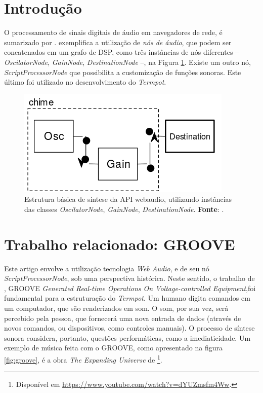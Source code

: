 \section{Introdução}\label{sec:introducao}




O processamento de sinais digitais de áudio em navegadores de rede, é sumarizado por \cite{w3c_web_2012,roberts_web_2013-,wyse_viability_2014}. \cite{srikumar_tamming_2013} exemplifica a utilização de \emph{nós de áudio}, que podem ser concatenados em um grafo de DSP, como três instâncias de nós diferentes -- \emph{OscilatorNode}, \emph{GainNode}, \emph{DestinationNode} --, na Figura \ref{fig:shime}. Existe um outro nó, \emph{ScriptProcessorNode} que possibilita a customização de funções sonoras. Este último foi utilizado no desenvolvimento do \emph{Termpot}.

\begin{figure}[h]
\centering
\includegraphics[scale=0.35]{chime.png}
\caption{Estrutura básica de síntese da API webaudio, utilizando instâncias das classes \emph{OscilatorNode}, \emph{GainNode}, \emph{DestinationNode}. \textbf{Fonte}: \cite{srikumar_tamming_2013}.}
\label{fig:shime}
\end{figure}

\section{Trabalho relacionado: GROOVE}

Este artigo envolve a utilização  tecnologia \emph{Web Audio}, e de seu nó \emph{ScriptProcessorNode}, sob uma perspectiva histórica. Neste sentido, o trabalho de \cite{mathews_groove_1970}, GROOVE \emph{Generated Real-time Operations On Voltage-controlled Equipment},foi fundamental para a estruturação do \emph{Termpot}. Um humano digita comandos em um computador, que são renderizados em som. O som, por sua vez, será percebido pela pessoa, que fornecerá uma nova entrada de dados (através de novos comandos, ou dispositivos, como controles manuais). O processo de síntese sonora considera, portanto, questões performáticas, como a imediaticidade. Um exemplo de música feita com o GROOVE, como apresentado na figura \ref{fig:groove}, é a obra \emph{The Expanding Universe} de \cite{spiegel_expanding_1975} \footnote{Disponível em \url{https://www.youtube.com/watch?v=dYUZmsfm4Ww}.}.

